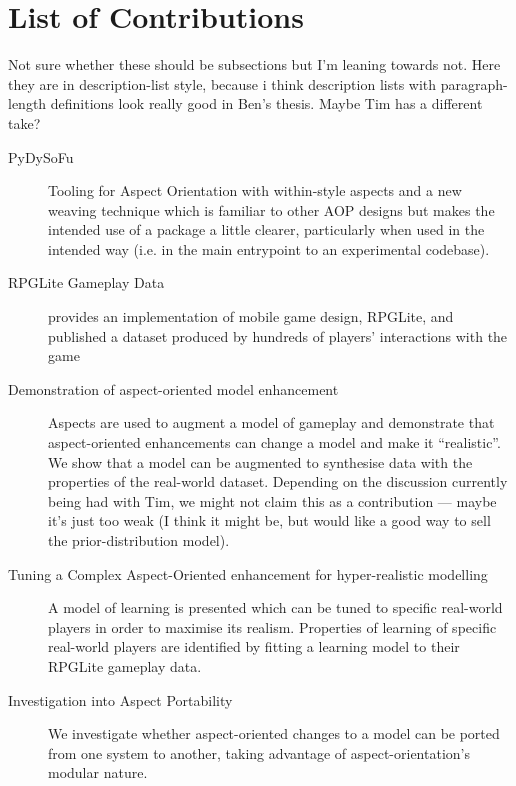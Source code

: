 \section{List of Contributions}

Not sure whether these should be subsections but I'm leaning towards not. Here
they are in description-list style, because i think description lists with
paragraph-length definitions look really good in Ben's thesis. Maybe Tim has a
different take?

\begin{description}
  \item[PyDySoFu] Tooling for Aspect Orientation with within-style aspects and a
    new weaving technique which is familiar to other AOP designs but makes the
    intended use of a package a little clearer, particularly when used in the
    intended way (i.e. in the main entrypoint to an experimental codebase).
  \item[RPGLite Gameplay Data] provides an implementation of mobile game design,
    RPGLite, and published a dataset produced by hundreds of players'
    interactions with the game 
  \item[Demonstration of aspect-oriented model enhancement] Aspects are used to
    augment a model of gameplay and demonstrate that aspect-oriented
    enhancements can change a model and make it ``realistic''. We show that a
    model can be augmented to synthesise data with the properties of the
    real-world dataset. Depending on the discussion currently being had with
    Tim, we might not claim this as a contribution --- maybe it's just too weak
    (I think it might be, but would like a good way to sell the
    prior-distribution model).
  \item[Tuning a Complex Aspect-Oriented enhancement for hyper-realistic
    modelling] A model of learning is presented which can be tuned to specific
    real-world players in order to maximise its realism. Properties of learning
    of specific real-world players are identified by fitting a learning model to
    their RPGLite gameplay data.
  \item[Investigation into Aspect Portability] We investigate whether
    aspect-oriented changes to a model can be ported from one system to another,
    taking advantage of aspect-orientation's modular nature. 
\end{description}


